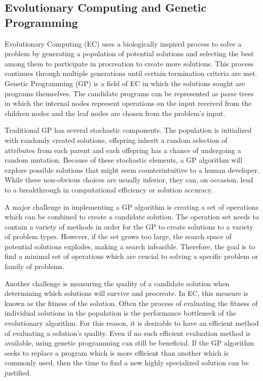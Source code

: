 \documentclass{article}
\begin{document}
\subsection{Evolutionary Computing and Genetic Programming}

Evolutionary Computing (EC) uses a biologically inspired process to solve a problem by generating
a population of potential solutions and selecting the best among them to participate in procreation
to create more solutions. This process continues through multiple generations until certain
termination criteria are met. Genetic Programming (GP) is a field of EC in which the solutions sought
are programs themselves. The candidate programs can be represented as parse trees in which the
internal nodes represent operations on the input received from the children nodes and the leaf
nodes are chosen from the problem's input.

Traditional GP has several stochastic components. The population is initialized with randomly created
solutions, offspring inherit a random selection of attributes from each parent and each offspring has
a chance of undergoing a random mutation. Because of these stochastic elements, a GP algorithm
will explore possible solutions that might seem counterintuitive to a human developer. While these
non-obvious choices are usually inferior, they can, on occasion, lead to a breakthrough in
computational efficiency or solution accuracy.

A major challenge in implementing a GP algorithm is creating a set of operations which can be
combined to create a candidate solution. The operation set needs to contain a variety of methods
in order for the GP to create solutions to a variety of problem types. However, if the set grows too
large, the search space of potential solutions explodes, making a search infeasible. Therefore, the
goal is to find a minimal set of operations which are crucial to solving a specific problem or family of
problems.

Another challenge is measuring the quality of a candidate solution when determining which solutions
will survive and procreate. In EC, this measure is known as the fitness of the solution. Often the
process of evaluating the fitness of individual solutions in the population is the performance bottleneck
of the evolutionary algorithm. For this reason, it is desirable to have an efficient method of evaluating
a solution's quality. Even if no such efficient evaluation method is available, using genetic programming
can still be beneficial. If the GP algorithm seeks to replace a program which is more efficient than another
which is commonly used, then the time to find a new highly specialized solution can be justified.
\end{document}
